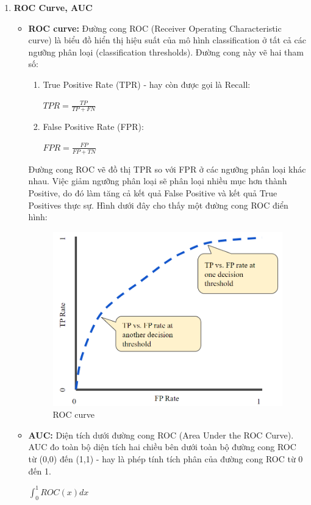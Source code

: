 \begin{enumerate}
        \item \textbf{ROC Curve, AUC} \cite{roc_auc}
    \begin{itemize}
        \item \textbf{ROC curve:} Đường cong ROC (Receiver Operating Characteristic curve) là biểu đồ hiển thị hiệu suất của mô hình classification ở tất cả các ngưỡng phân loại (classification thresholds). Đường cong này vẽ hai tham số: 
        \begin{enumerate}
            \item True Positive Rate (TPR) - hay còn được gọi là Recall:
            \begin{center}
             \large $TPR = \frac{TP}{TP + FN}$
            \end{center}
            \item False Positive Rate (FPR):
            \begin{center}
             \large $FPR = \frac{FP}{FP + TN}$
            \end{center}
        \end{enumerate}
        Đường cong ROC vẽ đồ thị TPR so với FPR ở các ngưỡng phân loại khác nhau. Việc giảm ngưỡng phân loại sẽ phân loại nhiều mục hơn thành Positive, do đó làm tăng cả kết quả False Positive và kết quả True Positives thực sự. Hình dưới đây cho thấy một đường cong ROC điển hình:
        \begin{figure}[H]
            \centering
            \includegraphics[width=0.5\linewidth]{img/ROC.png}
            \caption{ROC curve}
        \end{figure}
        \item \textbf{AUC:} Diện tích dưới đường cong ROC (Area Under the ROC Curve). AUC đo toàn bộ diện tích hai chiều bên dưới toàn bộ đường cong ROC từ (0,0) đến (1,1) - hay là phép tính tích phân của đường cong ROC từ 0 đến 1.
        \begin{center}
        \large $\int_{0}^{1} ROC(x)dx$
        \end{center}
        \begin{figure}[H]

\end{figure}
\end{itemize}
\end{enumerate}
